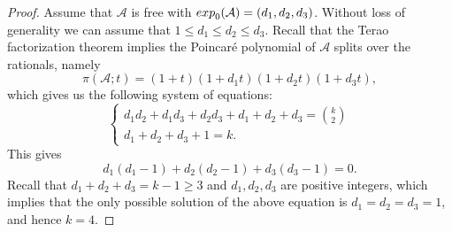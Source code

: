 \documentclass[10pt,a4paper]{amsart}
\begin{document}
\begin{proof}
Assume that $\mathcal{A}$ is free with ${\rm exp}_{0}(\mathcal{A}) = (d_{1},d_{2},d_{3})$. Without loss of generality we can assume that $1 \leq d_{1} \leq d_{2} \leq d_{3}$. Recall that the Terao factorization theorem implies the Poincar\'e polynomial of $\mathcal{A}$ splits over the rationals, namely
$$\pi(\mathcal{A};t) = (1+t)(1+d_{1}t)(1+d_{2}t)(1+d_{3}t),$$
which gives us the following system of equations:
$$\begin{cases}
d_{1}d_{2}+d_{1}d_{3}+d_{2}d_{3}+d_{1}+d_{2}+d_{3} = \binom{k}{2}\\
d_{1}+d_{2}+d_{3}+1=k.
\end{cases}$$
This gives
$$d_{1}(d_{1}-1) + d_{2}(d_{2}-1) + d_{3}(d_{3}-1)=0.$$
Recall that $d_{1}+d_{2}+d_{3}=k-1\geq 3$ and $d_{1},d_{2},d_{3}$ are positive integers, which implies that the only possible solution of the above equation is $d_{1}=d_{2}=d_{3}=1$, and hence $k=4$.
\end{proof}
\end{document}
